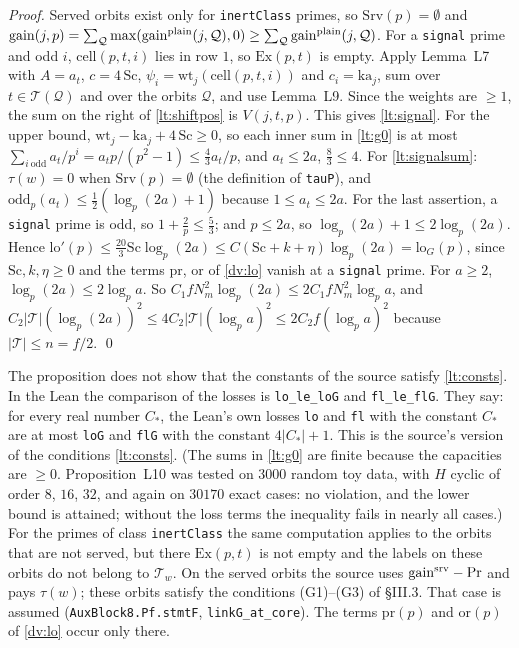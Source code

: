 \documentclass[11pt,letterpaper]{article}
\begin{document}
\emph{Proof.} Served orbits exist only for \texttt{inertClass} primes, so $\mathrm{Srv}(p)=\emptyset$ and
$\mathrm{gain}(j,p)=\sum_{\mathcal Q}\max(\mathrm{gain}^{\rm plain}(j,\mathcal Q),0)\ge\sum_{\mathcal Q}\mathrm{gain}^{\rm plain}(j,\mathcal Q)$.
For a \texttt{signal} prime and odd $i$, $\mathrm{cell}(p,t,i)$ lies in row $1$, so $\mathrm{Ex}(p,t)$ is
empty. Apply Lemma~L7 with $A=a_t$, $c=4\,\mathrm{Sc}$, $\psi_i=\mathrm{wt}_j(\mathrm{cell}(p,t,i))$ and
$c_i=\mathrm{ka}_j$, sum over $t\in\mathcal T(\mathcal Q)$ and over the orbits $\mathcal Q$, and use
Lemma~L9. Since the weights are $\ge1$, the sum on the right of \eqref{lt:shiftpos} is $V(j,t,p)$. This
gives \eqref{lt:signal}. For the upper bound, $\mathrm{wt}_j-\mathrm{ka}_j+4\,\mathrm{Sc}\ge0$, so each inner
sum in \eqref{lt:g0} is at most $\sum_{i\ \mathrm{odd}}a_t/p^i=a_tp/(p^2-1)\le\frac43a_t/p$, and
$a_t\le2a$, $\frac83\le4$. For \eqref{lt:signalsum}: $\tau(w)=0$ when $\mathrm{Srv}(p)=\emptyset$ (the
definition of \texttt{tauP}), and $\mathrm{odd}_p(a_t)\le\frac12(\log_p(2a)+1)$ because $1\le a_t\le2a$.
For the last assertion, a \texttt{signal} prime is odd, so $1+\frac2p\le\frac53$; and $p\le2a$, so
$\log_p(2a)+1\le2\log_p(2a)$. Hence
$\mathrm{lo}'(p)\le\frac{20}3\mathrm{Sc}\log_p(2a)\le C(\mathrm{Sc}+k+\eta)\log_p(2a)=\mathrm{lo}_G(p)$,
since $\mathrm{Sc},k,\eta\ge0$ and the terms $\mathrm{pr}$, $\mathrm{or}$ of \eqref{dv:lo} vanish at a
\texttt{signal} prime. For $a\ge2$, $\log_p(2a)\le2\log_pa$. So
$C_1fN_m^2\log_p(2a)\le2C_1fN_m^2\log_pa$, and
$C_2|\mathcal T|(\log_p(2a))^2\le4C_2|\mathcal T|(\log_pa)^2\le2C_2f(\log_pa)^2$ because
$|\mathcal T|\le n=f/2$. \qed

\noindent The proposition does not show that the constants of the source satisfy \eqref{lt:consts}. In the
Lean the comparison of the losses is \texttt{lo\_le\_loG} and \texttt{fl\_le\_flG}. They say: for every real
number $C_*$, the Lean's own losses \texttt{lo} and \texttt{fl} with the constant $C_*$ are at most
\texttt{loG} and \texttt{flG} with the constant $4|C_*|+1$. This is the source's version of the conditions
\eqref{lt:consts}.
(The sums in \eqref{lt:g0} are finite because the capacities are $\ge0$. Proposition~L10 was tested on
$3000$ random toy data, with $H$ cyclic of order $8$, $16$, $32$, and again on $30170$ exact cases: no
violation, and the lower bound is attained; without the loss terms the inequality fails in nearly all
cases.) For the primes of class \texttt{inertClass} the same computation applies to the orbits that are
not served, but there $\mathrm{Ex}(p,t)$ is not empty and the labels on these orbits do not belong to
$\mathcal T_w$. On the served orbits the source uses $\mathrm{gain}^{\rm srv}-\mathrm{Pr}$ and pays
$\tau(w)$; these orbits satisfy the conditions (G1)--(G3) of \S III.3. That case is assumed
(\texttt{AuxBlock8.Pf.stmtF}, \texttt{linkG\_at\_core}). The terms $\mathrm{pr}(p)$ and $\mathrm{or}(p)$ of
\eqref{dv:lo} occur only there.
\end{document}
